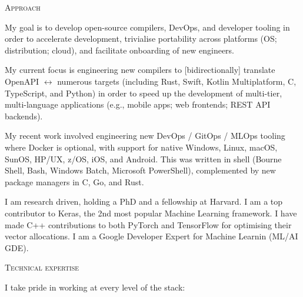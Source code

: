\documentclass[11pt, a4paper]{article}
\newcommand{\headright}[1]{\vspace*{2.5ex}\textsc{\Large\color{cvblue}#1}\par%
     \vspace*{-2ex}{\color{cvblue}\hrulefill}\par}
\begin{document}
\begin{minipage}[t]{0.56\textwidth}
\setlength{\parskip}{0.8ex}%

\vspace{2ex}
\hypersetup{urlcolor=black}
\hypersetup{linkcolor=black}

\headright{Approach}
My goal is to develop open-source compilers, DevOps, and developer tooling in order to accelerate development, trivialise portability across platforms (OS; distribution; cloud), and facilitate onboarding of new engineers.

My current focus is engineering new compilers to [bidirectionally] translate OpenAPI \(\leftrightarrow\) numerous targets (including Rust, Swift, Kotlin Multiplatform, C, TypeScript, and Python) in order to speed up the development of multi-tier, multi-language applications (e.g., mobile apps; web frontends; REST API backends).

My recent work involved engineering new DevOps / GitOps / MLOps tooling where Docker is optional, with support for native Windows, Linux, macOS, SunOS, HP/UX, z/OS, iOS, and Android.  This was written in shell (Bourne Shell, Bash, Windows Batch, Microsoft PowerShell), complemented by new package managers in C, Go, and Rust.

I am research driven, holding a PhD and a fellowship at Harvard. I am a top contributor to Keras, the 2nd most popular Machine Learning framework. I have made C++ contributions to both PyTorch and TensorFlow for optimising their vector allocations. I am a Google Developer Expert for Machine Learnin (ML/AI GDE).

\headright{Technical expertise}
I take pride in working at every level of the stack:


\end{minipage}
\end{document}
